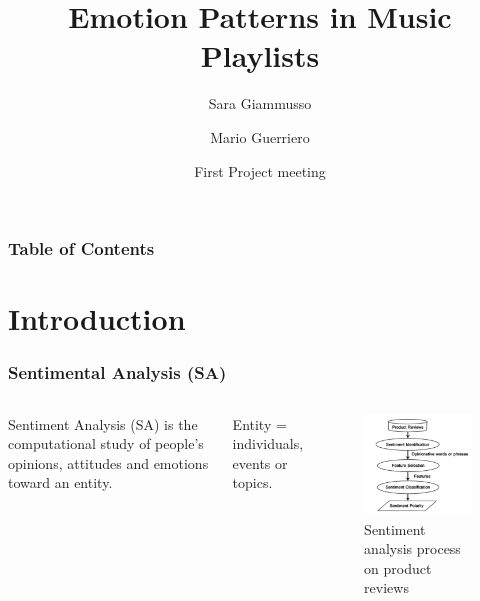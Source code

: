\documentclass[xcolor=dvipsnames]{beamer}
\title[Emotion Patterns in Music Playlists] %
{Emotion Patterns in Music Playlists}
\author[Sara, Mario] %
{Sara Giammusso\inst{1}\inst{2} \and Mario Guerriero \inst{1}\inst{2}}
\institute[EURECOM] %
{
 \inst{1}
 MSc student in Data Science Department, EURECOM, T\'el\'ecom ParisTech, France\\
  \inst{2}%
 MSc student in Department of Control and Computer Engineering, Politecnico di Torino, Italy
}
\date[2018 March 22] %
{First Project meeting}
\begin{document}
\frame{\titlepage}

\begin{frame}
\frametitle{Table of Contents}
\tableofcontents
\end{frame}

\section{Introduction}
\begin{frame}
\frametitle{Sentimental Analysis (SA)}
\begin{columns}
\begin{definition}
Sentiment Analysis (SA) is the computational study of people's opinions, attitudes and emotions toward an entity.
\end{definition}
Entity = individuals, events or topics.
\begin{figure}
	\centering
	\includegraphics[scale=0.45]{./images/sa_process}
	\caption{Sentiment analysis process on product reviews}
\end{figure}
\end{columns}
\end{frame}
\end{document}
